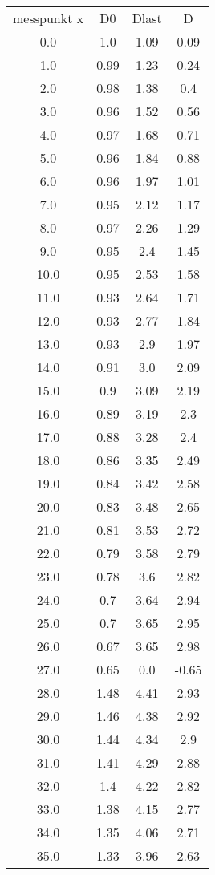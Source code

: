 \begin{table}
\begin{tabular}{cccc}
messpunkt x & D0 & Dlast & D \\
0.0 & 1.0 & 1.09 & 0.09 \\
1.0 & 0.99 & 1.23 & 0.24 \\
2.0 & 0.98 & 1.38 & 0.4 \\
3.0 & 0.96 & 1.52 & 0.56 \\
4.0 & 0.97 & 1.68 & 0.71 \\
5.0 & 0.96 & 1.84 & 0.88 \\
6.0 & 0.96 & 1.97 & 1.01 \\
7.0 & 0.95 & 2.12 & 1.17 \\
8.0 & 0.97 & 2.26 & 1.29 \\
9.0 & 0.95 & 2.4 & 1.45 \\
10.0 & 0.95 & 2.53 & 1.58 \\
11.0 & 0.93 & 2.64 & 1.71 \\
12.0 & 0.93 & 2.77 & 1.84 \\
13.0 & 0.93 & 2.9 & 1.97 \\
14.0 & 0.91 & 3.0 & 2.09 \\
15.0 & 0.9 & 3.09 & 2.19 \\
16.0 & 0.89 & 3.19 & 2.3 \\
17.0 & 0.88 & 3.28 & 2.4 \\
18.0 & 0.86 & 3.35 & 2.49 \\
19.0 & 0.84 & 3.42 & 2.58 \\
20.0 & 0.83 & 3.48 & 2.65 \\
21.0 & 0.81 & 3.53 & 2.72 \\
22.0 & 0.79 & 3.58 & 2.79 \\
23.0 & 0.78 & 3.6 & 2.82 \\
24.0 & 0.7 & 3.64 & 2.94 \\
25.0 & 0.7 & 3.65 & 2.95 \\
26.0 & 0.67 & 3.65 & 2.98 \\
27.0 & 0.65 & 0.0 & -0.65 \\
28.0 & 1.48 & 4.41 & 2.93 \\
29.0 & 1.46 & 4.38 & 2.92 \\
30.0 & 1.44 & 4.34 & 2.9 \\
31.0 & 1.41 & 4.29 & 2.88 \\
32.0 & 1.4 & 4.22 & 2.82 \\
33.0 & 1.38 & 4.15 & 2.77 \\
34.0 & 1.35 & 4.06 & 2.71 \\
35.0 & 1.33 & 3.96 & 2.63 \\

\end{tabular}
\end{table}
